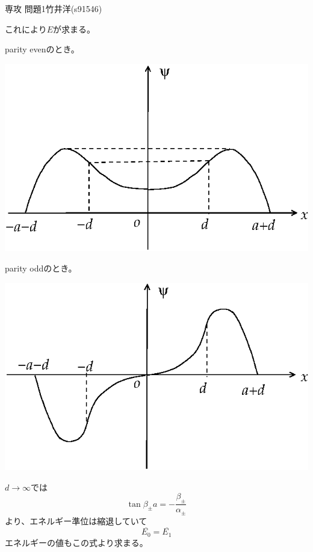 \documentclass[fleqn]{jbook}
\begin{document}
\begin{answer}{専攻 問題1}{竹井洋(s91546)}
\begin{subanswers}
\begin{itemize}
これにより$E$が求まる。

\end{itemize}

\SubAnswer

parity evenのとき。
\begin{center}
\includegraphics[clip]{1999phy1-2.eps}
\end{center}

parity oddのとき。
\begin{center}
\includegraphics[clip]{1999phy1-3.eps}
\end{center}

\SubAnswer
$d\rightarrow\infty$では
\[ \tan\beta_{\pm}a=-\frac{\beta_{\pm}}{\alpha_{\pm}} \]
より、エネルギー準位は縮退していて
\[ \overline{E_0}=\overline{E_1} \]
エネルギーの値もこの式より求まる。

\SubAnswer


\end{subanswers}
\end{answer}
\end{document}
